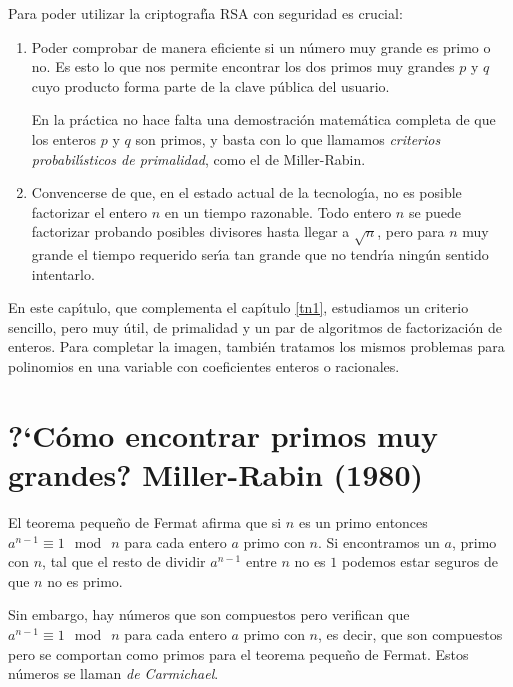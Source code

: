 

Para poder utilizar la criptograf\'{\i}a RSA con seguridad es crucial:
\begin{enumerate}
 \item Poder comprobar de manera eficiente si un n\'umero muy grande es primo o
no. Es esto lo que nos permite encontrar los dos primos muy grandes $p$ y $q$
cuyo producto forma parte de la clave p\'ublica del usuario. 

En la pr\'actica {\sc no} hace falta una demostraci\'on matem\'atica completa de
que los enteros $p$ y $q$ son primos, y basta con lo que llamamos {\itshape
criterios probabil\'{\i}sticos de primalidad}, como el de Miller-Rabin.
\item Convencerse de que, en el estado actual de la tecnolog\'{\i}a, no es
posible factorizar el entero $n$ en un tiempo razonable. Todo entero $n$ se
puede factorizar probando posibles divisores hasta llegar a $\sqrt{n}$, pero
para $n$ muy grande el tiempo requerido ser\'{\i}a tan grande que no
tendr\'{\i}a ning\'un sentido intentarlo.
 \end{enumerate}

En este cap\'{\i}tulo, que complementa el cap\'{\i}tulo \ref{tn1}, estudiamos un criterio
sencillo, pero muy \'util,  de primalidad y un par de algoritmos de
factorizaci\'on de enteros. Para completar la imagen, tambi\'en tratamos los
mismos problemas para polinomios en una variable con coeficientes enteros o
racionales.





\section{?`C\'omo encontrar primos muy grandes? Miller-Rabin (1980)}
El teorema peque\~no de Fermat afirma que si $n$ es un primo entonces
$a^{n-1}\equiv 1\mod\  n$ para cada entero $a$ primo con $n$. Si encontramos un
$a$, primo con $n$, tal que el resto de dividir $a^{n-1}$ entre $n$ no es $1$
podemos estar seguros de que $n$ {\sc no} es primo.

Sin embargo, hay n\'umeros que son compuestos pero verifican que $a^{n-1}\equiv
1\mod\  n$ para cada entero $a$ primo con $n$, es decir, que son compuestos
pero se comportan como primos para el teorema peque\~no de Fermat. Estos
n\'umeros se llaman {\itshape de Carmichael}.

\bigskip

